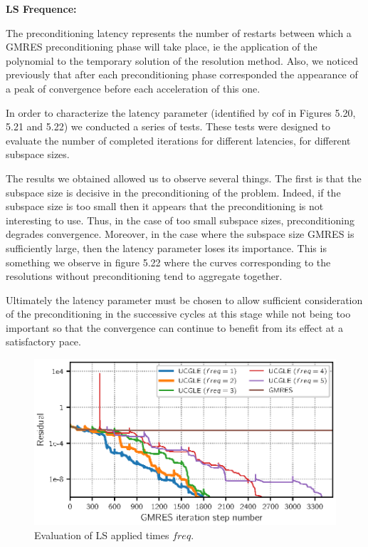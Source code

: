 \textbf{LS Frequence:}

The preconditioning latency represents the number of restarts between which a GMRES preconditioning phase will take place, ie the application of the polynomial to the temporary solution of the resolution method. Also, we noticed previously that after each preconditioning phase corresponded the appearance of a peak of convergence before each acceleration of this one.

In order to characterize the latency parameter (identified by cof in Figures 5.20, 5.21 and 5.22) we conducted a series of tests. These tests were designed to evaluate the number of completed iterations for different latencies, for different subspace sizes.

The results we obtained allowed us to observe several things. The first is that the subspace size is decisive in the preconditioning of the problem. Indeed, if the subspace size is too small then it appears that the preconditioning is not interesting to use. Thus, in the case of too small subspace sizes, preconditioning degrades convergence.  Moreover, in the case where the subspace size GMRES is sufficiently large, then the latency parameter loses its importance. This is something we observe in figure 5.22 where the curves corresponding to the resolutions without preconditioning tend to aggregate together.

Ultimately the latency parameter must be chosen to allow sufficient consideration of the preconditioning in the successive cycles at this stage while not being too important so that the convergence can continue to benefit from its effect at a satisfactory pace.

\begin{figure}[htbp]
	\centering
	\includegraphics[width=6.2in]{fig/conv_lsfreq.eps}
	\caption{Evaluation of LS applied times $freq$.}
	\label{fig:Lsfreq}
\end{figure}


